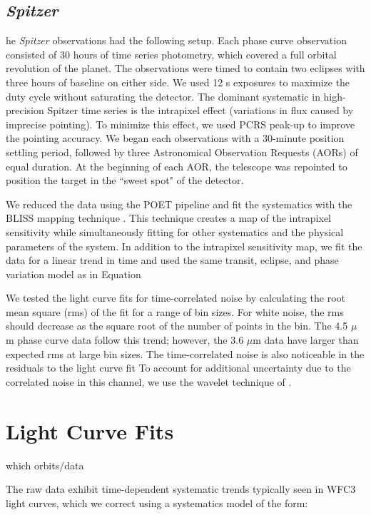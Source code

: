 \documentclass[twocolumn]{aastex61}
\newcommand{\project}[1]{\textsl{#1}}
\newcommand{\Spitzer}{\project{Spitzer}}
\begin{document}
\subsection{\Spitzer}
he \emph{Spitzer} observations had the following setup. Each phase curve observation consisted of 30 hours of time series photometry, which covered a full orbital revolution of the planet. The observations were timed to contain two eclipses with three hours of baseline on either side. We used 12 s exposures to maximize the duty cycle without saturating the detector. The dominant systematic in high-precision Spitzer time series is the intrapixel effect (variations in flux caused by imprecise pointing). To minimize this effect, we used PCRS peak-up to improve the pointing accuracy. We began each observations with a 30-minute position settling period, followed by three Astronomical Observation Requests (AORs) of equal duration. At the beginning of each AOR, the telescope was repointed to position the target in the ``sweet spot" of the detector.

We reduced the data using the POET pipeline and fit the systematics with the BLISS mapping technique \citep{stevenson12}. This technique creates a map of the intrapixel sensitivity while simultaneously fitting for other systematics and the physical parameters of the system. In addition to the intrapixel sensitivity map, we fit the data for a linear trend in time and used the same transit, eclipse, and phase variation model as in Equation%

We tested the light curve fits for time-correlated noise by calculating the root mean square (rms) of the fit for a range of bin sizes. For white noise, the rms should decrease as the square root of the number of points in the bin. The 4.5 $\mu$m phase curve data follow this trend; however, the 3.6 $\mu$m data have larger than expected rms at large bin sizes. The time-correlated noise is also noticeable in the residuals to the light curve fit %
To account for additional uncertainty due to the correlated noise in this channel, we use the wavelet technique of \cite{carter09}.


\section{Light Curve Fits}
which orbits/data

The raw data exhibit time-dependent systematic trends typically seen in WFC3 light curves, which we correct using a systematics model of the form:
\end{document}
